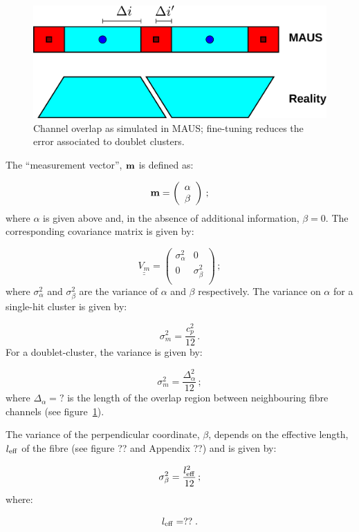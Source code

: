 \begin{figure}
  \begin{center}
    \includegraphics[width=0.9\linewidth]{detectors/tracker/04-Reconstruction/04-01-Hits-and-clusters/Figures/cluster-resolution.pdf}
  \end{center}
  \caption{Channel overlap as simulated in MAUS; fine-tuning reduces the error associated to doublet clusters.} 
  \label{Fig:Clust}
\end{figure}
The ``measurement vector'', ${\bf m}$ is defined as:

\begin{equation}
  {\bf m} =  \left( 
               \begin{array}{c}
                 \alpha \\ \beta
               \end{array}
              \right) \, ;
\end{equation}
where $\alpha$ is given above and, in the absence of additional information, $\beta = 0$. The corresponding covariance matrix is given by:

\begin{equation}
  \underline{\underline{V_m}} = 
    \left( 
      \begin{array}{cc}
         \sigma^2_\alpha & 0         \\
         0          & \sigma^2_\beta \\
       \end{array}
     \right) \, ;
\end{equation}
where $\sigma^2_\alpha$ and $\sigma^2_\beta$ are the variance of $\alpha$ and $\beta$ respectively. The variance on $\alpha$ for a single-hit cluster is given by:

\begin{equation}
  \sigma^2_m = \frac{c^2_p}{12} \, .
\end{equation}
For a doublet-cluster, the variance is given by:

\begin{equation}
  \sigma^2_m = \frac{\Delta^2_\alpha}{12} \, ;
\end{equation}
where $\Delta_\alpha = ?$ is the length of the overlap region between neighbouring fibre channels (see figure~\ref{Fig:Clust}). 

The variance of the perpendicular coordinate, $\beta$, depends on the effective length, $l_{\rm eff}$ of the fibre (see figure ?? and Appendix ??) and is given by:

\begin{equation}
  \sigma^2_\beta = \frac{l^2_{\rm eff}}{12} \, ;
\end{equation}
where:

\begin{equation}
  l_{\rm eff} = ?? \; .
\end{equation}

